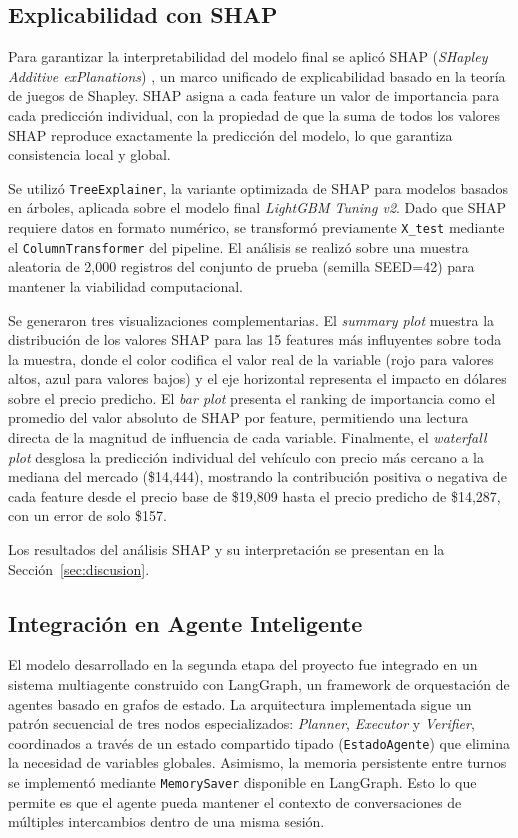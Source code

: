 \documentclass[conference]{IEEEtran}
\begin{document}
\subsection{Explicabilidad con SHAP}
\label{subsec:shap}

Para garantizar la interpretabilidad del modelo final se aplicó SHAP (\textit{SHapley Additive exPlanations}) \cite{lundberg2017}, un marco unificado de explicabilidad basado en la teoría de juegos de Shapley. SHAP asigna a cada feature un valor de importancia para cada predicción individual, con la propiedad de que la suma de todos los valores SHAP reproduce exactamente la predicción del modelo, lo que garantiza consistencia local y global.

Se utilizó \texttt{TreeExplainer}, la variante optimizada de SHAP para modelos basados en árboles, aplicada sobre el modelo final \textit{LightGBM Tuning v2}. Dado que SHAP requiere datos en formato numérico, se transformó previamente \texttt{X\_test} mediante el \texttt{ColumnTransformer} del pipeline. El análisis se realizó sobre una muestra aleatoria de 2{,}000 registros del conjunto de prueba (semilla SEED=42) para mantener la viabilidad computacional.

Se generaron tres visualizaciones complementarias. El \textit{summary plot} muestra la distribución de los valores SHAP para las 15 features más influyentes sobre toda la muestra, donde el color codifica el valor real de la variable (rojo para valores altos, azul para valores bajos) y el eje horizontal representa el impacto en dólares sobre el precio predicho. El \textit{bar plot} presenta el ranking de importancia como el promedio del valor absoluto de SHAP por feature, permitiendo una lectura directa de la magnitud de influencia de cada variable. Finalmente, el \textit{waterfall plot} desglosa la predicción individual del vehículo con precio más cercano a la mediana del mercado (\$14{,}444), mostrando la contribución positiva o negativa de cada feature desde el precio base de \$19{,}809 hasta el precio predicho de \$14{,}287, con un error de solo \$157.

Los resultados del análisis SHAP y su interpretación se presentan en la Sección~\ref{sec:discusion}.

\subsection{Integración en Agente Inteligente}
El modelo desarrollado en la segunda etapa del proyecto fue integrado en un sistema multiagente construido con LangGraph, un framework de orquestación de agentes basado en grafos de estado. La arquitectura implementada sigue un patrón secuencial de tres nodos especializados: \textit{Planner}, \textit{Executor} y \textit{Verifier}, coordinados a través de un estado compartido tipado (\texttt{EstadoAgente}) que elimina la necesidad de variables globales. Asimismo, la memoria persistente entre turnos se implementó mediante \texttt{MemorySaver} disponible en LangGraph. Esto lo que permite es que el agente pueda mantener el contexto de conversaciones de múltiples intercambios dentro de una misma sesión.
\end{document}
